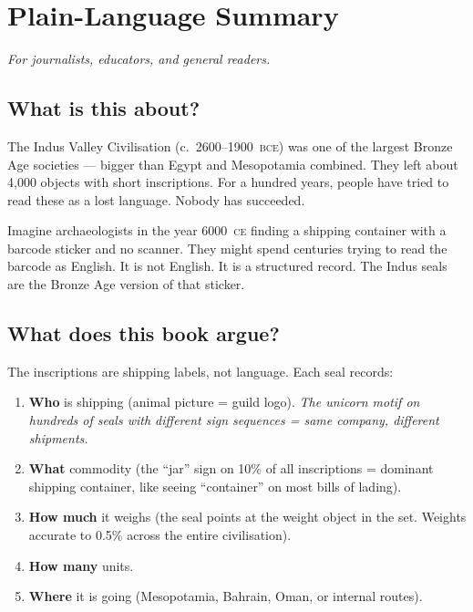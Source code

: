 \clearpage
\section{Plain-Language Summary}

\textit{For journalists, educators, and general readers.}

\subsection{What is this about?}

The Indus Valley Civilisation (c.\ 2600--1900~\textsc{bce}) was
one of the largest Bronze Age societies --- bigger than Egypt and
Mesopotamia combined. They left about 4{,}000 objects with short
inscriptions. For a hundred years, people have tried to read these
as a lost language. Nobody has succeeded.

Imagine archaeologists in the year 6000~\textsc{ce} finding a
shipping container with a barcode sticker and no scanner. They
might spend centuries trying to read the barcode as English. It is
not English. It is a structured record. The Indus seals are the
Bronze Age version of that sticker.

\subsection{What does this book argue?}

The inscriptions are shipping labels, not language. Each seal
records:

\begin{enumerate}
\item \textbf{Who} is shipping (animal picture = guild logo).
  \textit{The unicorn motif on hundreds of seals with different
  sign sequences = same company, different shipments.}
\item \textbf{What} commodity (the ``jar'' sign on 10\% of all
  inscriptions = dominant shipping container, like seeing
  ``container'' on most bills of lading).
\item \textbf{How much} it weighs (the seal points at the weight
  object in the set. Weights accurate to 0.5\% across the entire
  civilisation).
\item \textbf{How many} units.
\item \textbf{Where} it is going (Mesopotamia, Bahrain, Oman, or
  internal routes).
\end{enumerate}

